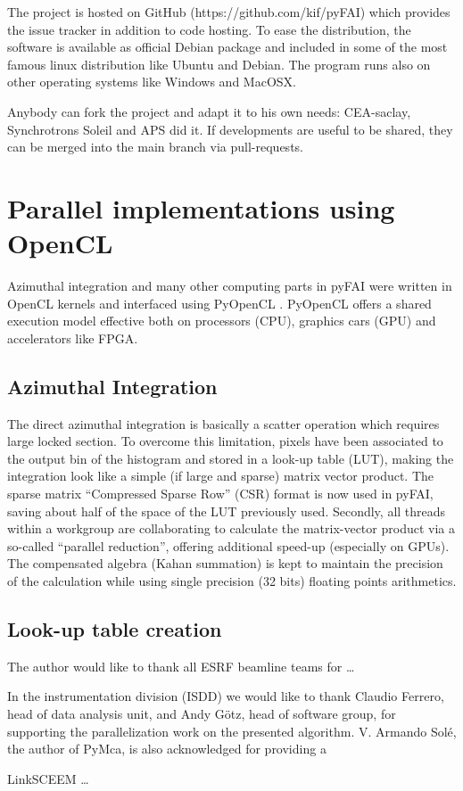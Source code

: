 \documentclass[preprint]{iucr}
\begin{document}
The project is hosted on GitHub (https://github.com/kif/pyFAI) which provides
the issue tracker in addition to code hosting.
To ease the distribution, the
software is available as official Debian package and included in some of the
most famous linux distribution like Ubuntu and Debian.
The program runs also on other operating systems like Windows and MacOSX.

Anybody can fork the project and adapt it to his own needs: CEA-saclay,
Synchrotrons Soleil and APS did it. If developments are useful to be shared,
they can be merged into the main branch via pull-requests.

\section{Parallel implementations using OpenCL}
Azimuthal integration and many other computing parts in pyFAI were written in
OpenCL kernels and interfaced using PyOpenCL \cite{pyopencl}. PyOpenCL offers a
shared execution model effective both on processors (CPU), graphics cars (GPU)
and accelerators like FPGA.

\subsection{Azimuthal Integration}
The direct azimuthal integration is basically a scatter operation which
requires large locked section.
To overcome this limitation, pixels have been
associated to the output bin of the histogram and stored in a look-up
table (LUT), making the integration look like a simple (if large and sparse)
matrix vector product.
The sparse matrix ``Compressed Sparse Row'' (CSR) format is now used in pyFAI,
saving about half of the space of the LUT previously used.
Secondly, all threads within a workgroup are collaborating to calculate the
matrix-vector product via a so-called ``parallel reduction'', offering
additional speed-up (especially on GPUs).
The compensated algebra (Kahan summation) is kept to maintain the precision
of the calculation while using single precision (32 bits) floating points
arithmetics.

\subsection{Look-up table creation}



The author would like to thank all ESRF beamline teams for \ldots

In the instrumentation division (ISDD) we would like to thank Claudio Ferrero,
head of data analysis unit, and Andy G\"otz, head of software group, for
supporting the parallelization work on the presented algorithm.
V. Armando Solé, the author of PyMca, is also acknowledged for providing a

LinkSCEEM \ldots
\end{document}
